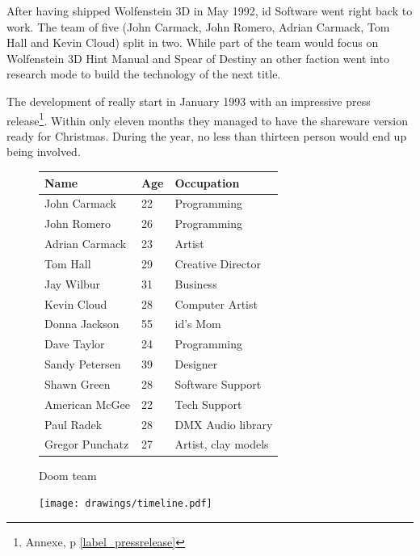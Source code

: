 After having shipped Wolfenstein 3D in May 1992, id Software went right back to work. The team of five (John Carmack, John Romero, Adrian Carmack, Tom Hall and Kevin Cloud) split in two. While part of the team would focus on Wolfenstein 3D Hint Manual and Spear of Destiny an other faction went into research mode to build the technology of the next title.\\
\par
The development of \doom really start in January 1993 with an impressive press release\protect\footnote{Annexe, p \ref{label_pressrelease}}. Within only eleven months they managed to have the shareware version ready for Christmas. During the year, no less than thirteen person would end up being involved.\\
\par
 \begin{figure}[H]
\centering  
\begin{tabularx}{\textwidth}{ X  X  X  }
  \toprule
  \textbf{Name} &  \textbf{Age} & \textbf{Occupation} \\
  \toprule 
   John Carmack & 22 &  Programming\\
   John Romero & 26 &  Programming\\
   Adrian Carmack & 23 &  Artist\\
   Tom Hall\protect\footnotemark  & 29 &  Creative Director\\
   Jay Wilbur & 31 &  Business\\
   Kevin Cloud& 28 &  Computer Artist\\
   Donna Jackson & 55 & id's Mom\\   
   Dave Taylor & 24 & Programming\\
   Sandy Petersen & 39 & Designer\\
   Shawn Green & 28 & Software Support\\
   American McGee & 22 & Tech Support\\
   Paul Radek & 28 & DMX Audio library\\
   Gregor Punchatz & 27 & Artist, clay models\\

     \toprule
\end{tabularx}
\caption{Doom team}\label{fig:Id Software team}
\end{figure}



\par
\begin{figure}[H]
\centering
\texttt{[image: drawings/timeline.pdf]}
\end{figure}
\par




